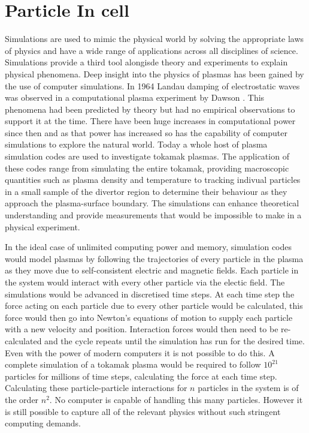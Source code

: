 

\chapter{Particle In cell} %
\label{Chapter3}

Simulations are used to mimic the physical world by solving the appropriate laws of physics and have a wide range of applications across all disciplines of science. Simulations provide a third tool alongisde theory and experiments to explain physical phenomena. Deep insight into the physics of plasmas has been gained by the use of computer simulations. In 1964 Landau damping of electrostatic waves was observed in a computational plasma experiment by Dawson \cite{Dawson}. This phenomena had been predicted by theory but had no empirical observations to support it at the time. There have been huge increases in computational power since then and as that power has increased so has the capability of computer simulations to explore the natural world. Today a whole host of plasma simulation codes are used to investigate tokamak plasmas. The application of these codes range from simulating the entire tokamak, providing macroscopic quantities such as plasma density and temperature to tracking indivual particles in a small sample of the divertor region to determine their behaviour as they approach the plasma-surface boundary. The simulations can enhance theoretical understanding and provide measurements that would be impossible to make in a physical experiment.    




In the ideal case of unlimited computing power and memory, simulation codes would model plasmas by following the trajectories of every particle in the plasma as they move due to self-consistent electric and magnetic fields. Each particle in the system would interact with every other particle via the electic field.  The simulations would be advanced in discretised time steps. At each time step the force acting on each particle due to every other particle would be calculated, this force would then go into Newton's equations of motion to supply each particle with a new velocity and position. Interaction forces would then need to be re-calculated and the cycle repeats until the simulation has run for the desired time. Even with the power of modern computers it is not possible to do this. A complete simulation of a  tokamak plasma would be required to follow $10^{21}$ particles for millions of time steps, calculating the force at each time step. Calculating these particle-particle interactions for $n$ particles in the system is of the order $n^2$. No computer is capable of handling this many particles. However it is still possible to capture all of the relevant physics without such stringent computing demands.

